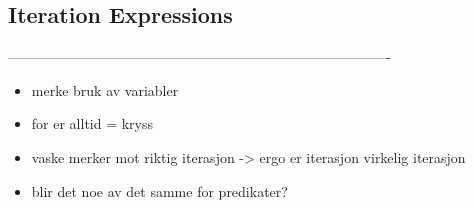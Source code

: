\subsection{Iteration Expressions}
\label{sect:translation:iteration}



----------------------------------------------------------------------------------
\label{sect:method:madslifting}
\begin{itemize}
\item merke bruk av variabler
\item for er alltid = kryss
\item vaske merker mot riktig iterasjon -> ergo er iterasjon virkelig iterasjon
\item blir det noe av det samme for predikater?
\end{itemize}